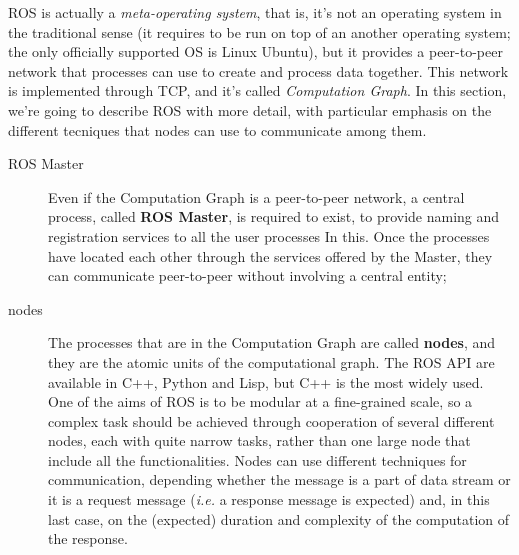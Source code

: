 \ac{ROS} is actually a \textit{meta-operating system}, that is, it's not an operating system in the traditional sense (it requires to be run on top of an another operating system; the only officially supported OS is Linux Ubuntu), but it provides a peer-to-peer network that processes can use to create and process data together. This network is implemented through TCP, and it's called \textit{Computation Graph}. In this section, we're going to describe \ac{ROS} with more detail, with particular emphasis on the different tecniques that nodes can use to communicate among them.
\begin{description}
\item[ROS Master] Even if the Computation Graph is a peer-to-peer network, a central process, called  \textbf{\ac{ROS} Master}, is required to exist, to provide naming and registration services to all the user processes In this. Once the processes have located each other through the services offered by the Master, they can communicate peer-to-peer without involving a central entity;

\item[nodes] The processes that are in the Computation Graph are called \textbf{nodes}, and they are the atomic units of the computational graph. The \ac{ROS} API are available in C++, Python and Lisp, but C++ is the most widely used. One of the aims of \ac{ROS} is to be modular at a fine-grained scale, so a complex task should be achieved through cooperation of several different nodes, each with quite narrow tasks, rather than one large node that include all the functionalities. Nodes can use different techniques for communication, depending whether the message is a part of data stream or it is a request message (\textit{i.e.} a response message is expected) and, in this last case, on the (expected) duration and complexity of the computation of the response.


\end{description}

